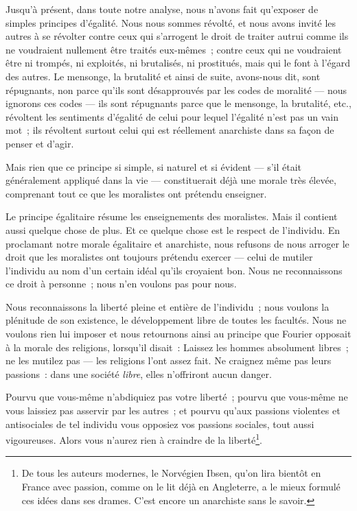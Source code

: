 \documentclass[french,twoside]{book} %
\begin{document}
\noindent Jusqu’à présent, dans toute notre analyse, nous n’avons fait qu’exposer de simples principes d’égalité. Nous nous sommes révolté, et nous avons invité les autres à se révolter contre ceux qui s’arrogent le droit de traiter autrui comme ils ne voudraient nullement être traités eux-mêmes ; contre ceux qui ne voudraient être ni trompés, ni exploités, ni brutalisés, ni prostitués, mais qui le font à l’égard des autres. Le mensonge, la brutalité et ainsi de suite, avons-nous dit, sont répugnants, non parce qu’ils sont désapprouvés par les codes de moralité — nous ignorons ces codes — ils sont répugnants parce que le mensonge, la brutalité, etc., révoltent les sentiments d’égalité de celui pour lequel l’égalité n’est pas un vain mot ; ils révoltent surtout celui qui est réellement anarchiste dans sa façon de penser et d’agir.\par
\bigbreak
\noindent Mais rien que ce principe si simple, si naturel et si évident — s’il était généralement appliqué dans la vie — constituerait déjà une morale très élevée, comprenant tout ce que les moralistes ont prétendu enseigner.\par
 Le principe égalitaire résume les enseignements des moralistes. Mais il contient aussi quelque chose de plus. Et ce quelque chose est le respect de l’individu. En proclamant notre morale égalitaire et anarchiste, nous refusons de nous arroger le droit que les moralistes ont toujours prétendu exercer — celui de mutiler l’individu au nom d’un certain idéal qu’ils croyaient bon. Nous ne reconnaissons ce droit à personne ; nous n’en voulons pas pour nous.\par
Nous reconnaissons la liberté pleine et entière de l’individu ; nous voulons la plénitude de son existence, le développement libre de toutes les facultés. Nous ne voulons rien lui imposer et nous retournons ainsi au principe que Fourier opposait à la morale des religions, lorsqu’il disait : Laissez les hommes absolument libres ; ne les mutilez pas — les religions l’ont assez fait. Ne craignez même pas leurs passions : dans une société \emph{libre}, elles n’offriront aucun danger.\par
Pourvu que vous-même n’abdiquiez pas votre liberté ; pourvu que vous-même ne vous laissiez pas asservir par les autres ; et pourvu qu’aux passions violentes et antisociales de tel individu vous opposiez vos passions sociales, tout aussi vigoureuses. Alors vous n’aurez rien à craindre de la liberté\footnote{ \noindent De tous les auteurs modernes, le Norvégien Ibsen, qu’on lira bientôt en France avec passion, comme on le lit déjà en Angleterre, a le mieux formulé ces idées dans ses drames. C’est encore un anarchiste sans le savoir.
 }.\par
\end{document}

